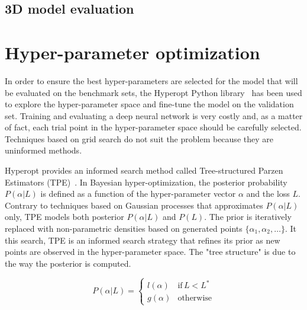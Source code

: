     \subsection{3D model evaluation}


\section{Hyper-parameter optimization}

  In order to ensure the best hyper-parameters are selected for the model that will be evaluated
  on the benchmark sets, the Hyperopt Python library~\cite{Bergstra_2015} has been used to explore
  the hyper-parameter space and fine-tune the model on the validation set.
  Training and evaluating a deep neural network is very costly and, as a matter of fact,
  each trial point in the hyper-parameter space should be carefully selected. Techniques based
  on grid search do not suit the problem because they are uninformed methods.

  Hyperopt provides an informed search method called Tree-structured Parzen Estimators (TPE)~\cite{bergstra2011algorithms}.
  In Bayesian hyper-optimization, the posterior probability $P(\alpha \vert L)$ is defined as a function  %
  of the hyper-parameter vector $\alpha$ and the loss $L$. Contrary to techniques based on Gaussian processes
  that approximates $P(\alpha \vert L)$ only, TPE models both posterior $P(\alpha \vert L)$ and $P(L)$.
  The prior is iteratively replaced with non-parametric densities based on generated points $\{ \alpha_1, \alpha_2, \dotsc \}$.
  It this search, TPE is an informed search strategy that refines its prior as new points are observed in the
  hyper-parameter space. The "tree structure" is due to the way the posterior is computed.

  \begin{equation}
    P(\alpha \vert L) =
      \begin{cases}
        l(\alpha) &  \text{if} \, L < L^* \\
        g(\alpha) &  \text{otherwise}
      \end{cases}
  \end{equation}  %


